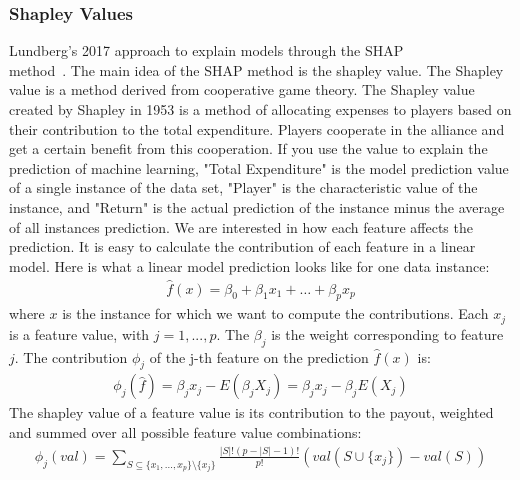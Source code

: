 \subsubsection{Shapley Values}
Lundberg's 2017 approach to explain models through the SHAP\\ method~\cite{lundberg2017unified}. The main idea of the SHAP method is the shapley value. The Shapley value is a method derived from cooperative game theory. The Shapley value created by Shapley in 1953 is a method of allocating expenses to players based on their contribution to the total expenditure. Players cooperate in the alliance and get a certain benefit from this cooperation. If you use the value to explain the prediction of machine learning, "Total Expenditure" is the model prediction value of a single instance of the data set, "Player" is the characteristic value of the instance, and "Return" is the actual prediction of the instance minus the average of all instances prediction.
We are interested in how each feature affects the prediction. It is easy to calculate the contribution of each feature in a linear model. Here is what a linear model prediction looks like for one data instance:
\begin{equation}
\begin{aligned}
\hat{f}(x)=\beta_0+\beta_{1}x_{1}+\ldots+\beta_{p}x_{p}
\end{aligned}
\label{eqn:eq3}
\end{equation}
where $x$ is the instance for which we want to compute the contributions. Each $x_j$ is a feature value, with $j = 1,...,p$. The $\beta_j$ is the weight corresponding to feature $j$.
The contribution $\phi_j$ of the j-th feature on the prediction $\hat{f}(x)$ is:
\begin{equation}
\begin{aligned}
\phi_j(\hat{f})=\beta_{j}x_j-E(\beta_{j}X_{j})=\beta_{j}x_j-\beta_{j}E(X_{j})
\end{aligned}
\label{eqn:eq4}
\end{equation}
The shapley value of a feature value is its contribution to the payout, weighted and summed over all possible feature value combinations:
\begin{equation}
\begin{aligned}
\phi_j(val)=\sum_{S\subseteq\{x_{1},\ldots,x_{p}\}\setminus\{x_j\}}\frac{|S|!\left(p-|S|-1\right)!}{p!}\left(val\left(S\cup\{x_j\}\right)-val(S)\right)
\end{aligned}
\label{eqn:eq5}
\end{equation}
